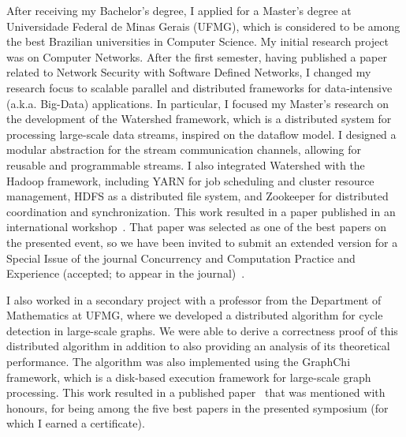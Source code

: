 \documentclass{article}
\begin{document}
After receiving my Bachelor's degree, I applied for a Master's degree at
Universidade Federal de Minas Gerais (UFMG), which is considered to be among
the best Brazilian universities in Computer Science.  My initial research
project was on Computer Networks.
After the first semester, having published a paper~\cite{rocha2013smtd} related
to Network Security with Software Defined Networks, I changed my research focus
to scalable parallel and distributed frameworks for data-intensive (a.k.a.
Big-Data) applications.
In particular, I focused my Master's research on the development of the
Watershed framework, which is a distributed system for processing large-scale
data streams, inspired on the dataflow model.  I designed a modular abstraction
for the stream communication channels, allowing for reusable and programmable
streams. I also integrated Watershed with the Hadoop framework, including YARN
for job scheduling and cluster resource management, HDFS as a distributed file
system, and Zookeeper for distributed coordination and synchronization. This
work resulted in a paper published in an international
workshop~\cite{rocha2014watershed}. That paper was selected as one of the best
papers on the presented event, so we have been invited to submit an extended
version for a Special Issue of the journal Concurrency and Computation Practice
and Experience (accepted; to appear in the journal)~\cite{rocha2016watershedng}.

I also worked in a secondary project with a professor from the Department of
Mathematics at UFMG, where we developed a distributed algorithm for cycle
detection in large-scale graphs. We were able to derive a correctness proof of
this distributed algorithm in addition to also providing an analysis of its
theoretical performance.  The algorithm was also implemented using the GraphChi
framework, which is a disk-based execution framework for large-scale graph
processing. This work resulted in a published paper~\cite{rocha2015cycles} that
was mentioned with honours, for being among the five best papers in the
presented symposium (for which I earned a certificate).
\end{document}
